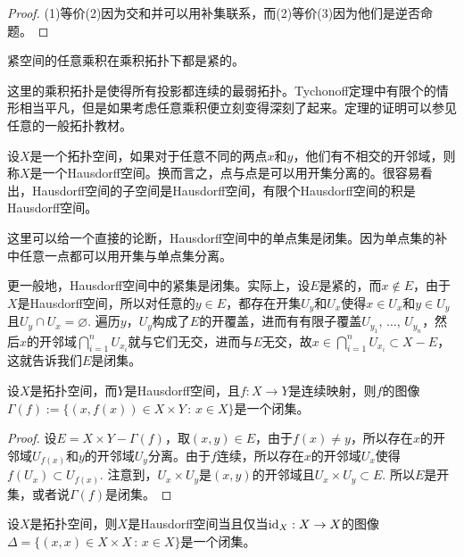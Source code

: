 \begin{proof}
	(1)等价(2)因为交和并可以用补集联系，而(2)等价(3)因为他们是逆否命题。
\end{proof}

\begin{thm}[Tychonoff定理]\label{tychonoff}
紧空间的任意乘积在乘积拓扑下都是紧的。
\end{thm}

这里的乘积拓扑是使得所有投影都连续的最弱拓扑。Tychonoff定理中有限个的情形相当平凡，但是如果考虑任意乘积便立刻变得深刻了起来。定理的证明可以参见任意的一般拓扑教材。

\begin{para}[Hausdorff空间]
设$X$是一个拓扑空间，如果对于任意不同的两点$x$和$y$，他们有不相交的开邻域，则称$X$是一个Hausdorff空间。换而言之，点与点是可以用开集分离的。很容易看出，Hausdorff空间的子空间是Hausdorff空间，有限个Hausdorff空间的积是Hausdorff空间。

这里可以给一个直接的论断，Hausdorff空间中的单点集是闭集。因为单点集的补中任意一点都可以用开集与单点集分离。

更一般地，Hausdorff空间中的紧集是闭集。实际上，设$E$是紧的，而$x\not\in E$，由于$X$是Hausdorff空间，所以对任意的$y\in E$，都存在开集$U_y$和$U_x$使得$x\in U_x$和$y\in U_y$且$U_y\cap U_x=\varnothing$. 遍历$y$，$U_y$构成了$E$的开覆盖，进而有有限子覆盖$U_{y_1}$, $\dots$, $U_{y_n}$，然后$x$的开邻域$\bigcap_{i=1}^n U_{x_i}$就与它们无交，进而与$E$无交，故$x\in \bigcap_{i=1}^n U_{x_i}\subset X-E$，这就告诉我们$E$是闭集。
\end{para}

\begin{pro}
设$X$是拓扑空间，而$Y$是Hausdorff空间，且$f:X\to Y$是连续映射，则$f$的图像$\Gamma(f):=\{(x,f(x))\in X\times Y\,:\, x\in X\}$是一个闭集。
\end{pro}

\begin{proof}
设$E=X\times Y- \Gamma(f)$，取$(x,y)\in E$，由于$f(x)\neq y$，所以存在$x$的开邻域$U_{f(x)}$和$y$的开邻域$U_y$分离。由于$f$连续，所以存在$x$的开邻域$U_x$使得$f(U_x)\subset U_{f(x)}$. 注意到，$U_x\times U_y$是$(x,y)$的开邻域且$U_x\times U_y\subset E$. 所以$E$是开集，或者说$\Gamma(f)$是闭集。
\end{proof}

\begin{pro}\label{pro.1.4}
设$X$是拓扑空间，则$X$是Hausdorff空间当且仅当$\operatorname{id}_X:X\to X$的图像$\Delta=\{(x,x)\in X\times X\,:\, x\in X\}$是一个闭集。
\end{pro}

